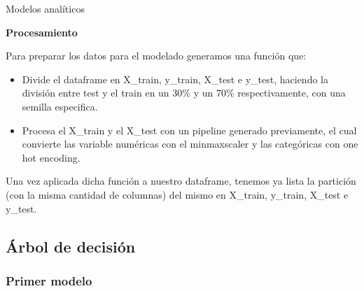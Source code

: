 \documentclass[pdf]{beamer}
\begin{document}
\begin{frame}{Modelos analíticos}

    \begin{Large}
        \textbf{Procesamiento}
    \end{Large}
    \newline

    Para preparar los datos para el modelado generamos una función que:
    \begin{itemize}
        \item  Divide el dataframe en X\_train, y\_train, X\_test e y\_test, haciendo la división entre test y el train en un 30\% y un 70\% respectivamente, con una semilla especifica.
        \item  Procesa el X\_train y el X\_test con un pipeline generado previamente, el cual convierte las variable numéricas con el minmaxscaler y las categóricas con one hot encoding.
    \end{itemize}

    Una vez aplicada dicha función a nuestro dataframe, tenemos ya lista la partición (con la misma cantidad de columnas) del mismo en X\_train, y\_train, X\_test e y\_test.

\end{frame}

    \subsection{Árbol de decisión}

        \subsubsection{Primer modelo}
\end{document}
